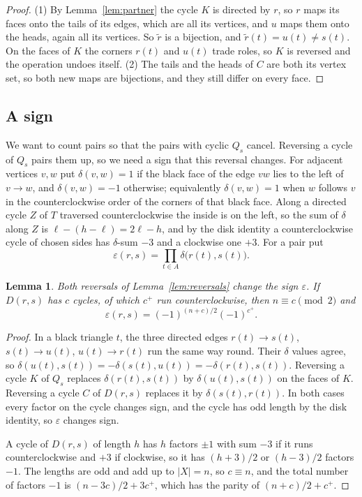 \documentclass[10pt]{amsart}
\numberwithin{equation}{section}
\newtheorem{lemma}[equation]{Lemma}
\theoremstyle{definition}
\theoremstyle{remark}
\newcommand{\T}{T}
\newcommand{\eps}{\varepsilon}
\begin{document}
\begin{proof}
(1) By Lemma~\ref{lem:partner} the cycle $K$ is directed by $r$, so $r$ maps its faces onto the tails of its edges, which are all its vertices, and $u$ maps them onto the heads, again all its vertices.
So $\tilde r$ is a bijection, and $\tilde r(t)=u(t)\neq s(t)$.
On the faces of $K$ the corners $r(t)$ and $u(t)$ trade roles, so $K$ is reversed and the operation undoes itself.
(2) The tails and the heads of $C$ are both its vertex set, so both new maps are bijections, and they still differ on every face.
\end{proof}

\subsection*{A sign}
We want to count pairs so that the pairs with cyclic $Q_s$ cancel.
Reversing a cycle of $Q_s$ pairs them up, so we need a sign that this reversal changes.
For adjacent vertices $v,w$ put $\delta(v,w)=1$ if the black face of the edge $vw$ lies to the left of $v\to w$, and $\delta(v,w)=-1$ otherwise; equivalently $\delta(v,w)=1$ when $w$ follows $v$ in the counterclockwise order of the corners of that black face.
Along a directed cycle $Z$ of $\T$ traversed counterclockwise the inside is on the left, so the sum of $\delta$ along $Z$ is $\ell-(h-\ell)=2\ell-h$, and by the disk identity a counterclockwise cycle of chosen sides has $\delta$-sum $-3$ and a clockwise one $+3$.
For a pair put
\[
\eps(r,s)=\prod_{t\in A}\delta\bigl(r(t),s(t)\bigr).
\]

\begin{lemma}\label{lem:sign}
Both reversals of Lemma~\ref{lem:reversals} change the sign $\eps$.
If $D(r,s)$ has $c$ cycles, of which $c^+$ run counterclockwise, then $n\equiv c\pmod 2$ and
\[
\eps(r,s)=(-1)^{(n+c)/2}(-1)^{c^+}.
\]
\end{lemma}

\begin{proof}
In a black triangle $t$, the three directed edges $r(t)\to s(t)$, $s(t)\to u(t)$, $u(t)\to r(t)$ run the same way round. Their $\delta$ values agree, so $\delta(u(t),s(t))=-\delta(s(t),u(t))=-\delta(r(t),s(t))$.
Reversing a cycle $K$ of $Q_s$ replaces $\delta(r(t),s(t))$ by $\delta(u(t),s(t))$ on the faces of $K$. Reversing a cycle $C$ of $D(r,s)$ replaces it by $\delta(s(t),r(t))$.
In both cases every factor on the cycle changes sign, and the cycle has odd length by the disk identity, so $\eps$ changes sign.

A cycle of $D(r,s)$ of length $h$ has $h$ factors $\pm1$ with sum $-3$ if it runs counterclockwise and $+3$ if clockwise, so it has $(h+3)/2$ or $(h-3)/2$ factors $-1$.
The lengths are odd and add up to $|X|=n$, so $c\equiv n$, and the total number of factors $-1$ is $(n-3c)/2+3c^+$, which has the parity of $(n+c)/2+c^+$.
\end{proof}
\end{document}
